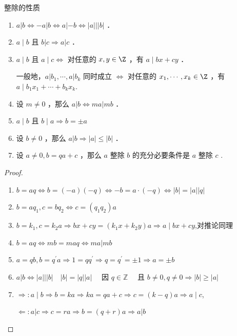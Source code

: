 \begin{proposition}整除的性质
	
	
	\begin{enumerate}
		\item$a|b \Longleftrightarrow-a| b \Longleftrightarrow a|-b \Longleftrightarrow| a|||b|$ ．
		\item$a \mid b$ 且 $b|c \Rightarrow a| c$ ．
		\item$a \mid b$ 且 $a \mid c \Longleftrightarrow$ 对任意的 $x, y \in \Z$ ，有 $a \mid b x+c y$ ．
		
		
		一般地，$a\left|b_1, \cdots, a\right| b_k$ 同时成立 $\Longleftrightarrow$ 对任意的 $x_1, \cdots, x_k \in \Z$ ，有 $a \mid b_1 x_1+\cdots+b_k x_k$.
		\item 设 $m \neq 0$ ，那么 $a|b \Longleftrightarrow m a| m b$ ．
		\item$a \mid b$ 且 $b \mid a \Longrightarrow b= \pm a$ 
		\item 设 $b \neq 0$ ，那么 $a|b \Longrightarrow| a|\leqslant|b|$ ．
		\item 设 $a \neq 0, b=q a+c$ ，那么 $a$ 整除 $b$ 的充分必要条件是 $a$ 整除 $c$ .
	\end{enumerate}
\end{proposition}
\begin{proof}
	\begin{enumerate}
		\item$b=a q \Leftrightarrow b=(-a)(-q) \Leftrightarrow-b=a \cdot(-q) \Leftrightarrow|b|=|a||q|$
		\item$b=a q_1, c=b q_2 \Leftrightarrow c=\left(q_1 q_2\right) a$
		\item$b=k_1 , c=k_2 a \Rightarrow b x+c y=\left(k_1 x+k_2 y\right) a \Rightarrow a \mid b x+c y$,对推论同理
		\item$b=a q \Leftrightarrow m b=m a  q\Leftrightarrow m a| m b$
		\item $a=q b, b=q^{\prime} a \Rightarrow 1=q q^{\prime} \Rightarrow q=q^{\prime}= \pm 1 \Rightarrow a= \pm b$
		\item $a|b \Leftrightarrow| a|||b| \quad| b|=|q||a| \quad$ 因 $q \in \mathbb{Z} \quad$ 且 $b \neq 0, q \neq 0 \Rightarrow|b| \geqslant|a|$
		\item $\Rightarrow: a \mid b \Rightarrow b=k a \Rightarrow k a=q a+c \Rightarrow c=(k-q) a\Rightarrow a \mid c$,
		
		$\Leftarrow :a|c \Rightarrow c=r a \Rightarrow b=(q+r) a \Rightarrow a| b$
		
	\end{enumerate}
\end{proof}
